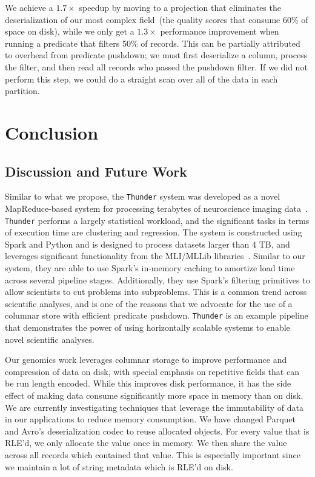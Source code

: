 \documentclass[10pt]{report} %
\begin{document}
We achieve a $1.7\times$ speedup by moving to a projection that eliminates the deserialization of our most
complex field~(the quality scores that consume 60\% of space on disk), while we only get a $1.3\times$
performance improvement when running a predicate that filters 50\% of records. This can be partially attributed
to overhead from predicate pushdown; we must first deserialize a column, process the filter, and then read all
records who passed the pushdown filter. If we did not perform this step, we could do a straight scan over all of
the data in each partition.

\chapter{Conclusion}

\section{Discussion and Future Work}
\label{sec:discussion-future-work}

Similar to what we propose, the \texttt{Thunder} system was developed as a novel MapReduce-based system for
processing terabytes of neuroscience imaging data~\cite{freeman14}. \texttt{Thunder} performs a largely statistical
workload, and the significant tasks in terms of execution time are clustering and regression. The system is
constructed using Spark and Python and is designed to process datasets larger than 4 TB, and leverages
significant functionality from the MLI/MLLib libraries~\cite{sparks13}. Similar to our system, they are able to use
Spark's in-memory caching to amortize load time across several pipeline stages. Additionally, they use Spark's
filtering primitives to allow scientists to cut problems into subproblems. This is a common trend across scientific
analyses, and is one of the reasons that we advocate for the use of a columnar store with efficient predicate
pushdown. \texttt{Thunder} is an example pipeline that demonstrates the power of using horizontally scalable
systems to enable novel scientific analyses.

Our genomics work leverages columnar storage to improve performance and compression of data on disk,
with special emphasis on repetitive fields that can be run length encoded. While this improves
disk performance, it has the side effect of making data consume significantly more space in memory
than on disk. We are currently investigating techniques that leverage the immutability of data in our
applications to reduce memory consumption. We have changed Parquet and Avro's deserialization codec
to reuse allocated objects. For every value that is RLE'd, we only allocate the value once in memory. We
then share the value across all records which contained that value. This is especially important since we
maintain a lot of string metadata which is RLE'd on disk.
\end{document}
